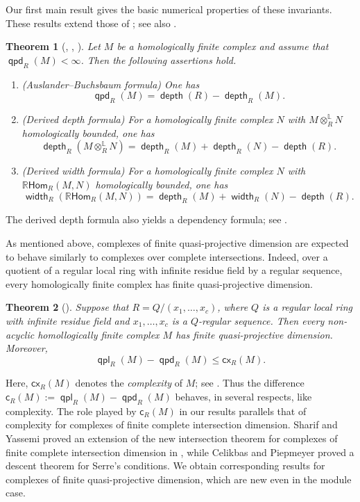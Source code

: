 \documentclass[10pt, a4paper,reqno]{amsart}
\newtheorem{thm}{Theorem}[section]
\theoremstyle{definition}
\theoremstyle{remark}
\numberwithin{equation}{thm}
\def\c{\mathsf{c}}
\def\depth{\operatorname{\mathsf{depth}}}
\def\width{\operatorname{\mathsf{width}}}
\def\ltensor{\otimes^{\mathbb{L}}}
\def\rHom{\mathbb{R}\mathsf{Hom}}
\def\cx{\mathsf{cx}}
\def\qpd{\operatorname{\mathsf{qpd}}}
\def\qpl{\operatorname{\mathsf{qpl}}}
\begin{document}
Our first main result gives the basic numerical properties of these invariants.
These results extend those of \cite{FL, GJT}; see also \cite{JPMMR}.

\begin{thm}[, , ]
Let $M$ be a homologically finite complex and assume that $\qpd_R(M)<\infty$.
Then the following assertions hold.
\begin{enumerate}[\rm(1)]
\item
{\rm(Auslander--Buchsbaum formula)}
One has
\[
\qpd_R(M)=\depth(R)-\depth_R(M).
\]

\item
{\rm(Derived depth formula)}
For a homologically finite complex $N$ with $M\ltensor_RN$ homologically bounded, one has
\[
\depth_R(M\ltensor_RN)
=
\depth_R(M)+\depth_R(N)-\depth(R).
\]

\item
{\rm(Derived width formula)}
For a homologically finite complex $N$ with $\rHom_R(M,N)$ homologically bounded, one has
\[
\width_R(\rHom_R(M,N))
=
\depth_R(M)+\width_R(N)-\depth(R).
\]
\end{enumerate}
\end{thm}
\noindent
The derived depth formula also yields a dependency formula; see .

As mentioned above, complexes of finite quasi-projective dimension are expected to behave similarly to complexes over complete intersections.
Indeed, over a quotient of a regular local ring with infinite residue field by a regular sequence, every homologically finite complex has finite quasi-projective dimension.

\begin{thm}[]
Suppose that $R=Q/(x_1,\ldots,x_c)$, where $Q$ is a regular local ring with infinite residue field and $x_1,\ldots,x_c$ is a $Q$-regular sequence.
Then every non-acyclic homollogically finite complex $M$ has finite quasi-projective dimension.
Moreover,
\[
\qpl_R(M)-\qpd_R(M)\leq\cx_R(M).
\]
\end{thm}
\noindent
Here, $\cx_R(M)$ denotes the {\em complexity} of $M$; see \cite{IFR,AGP}.
Thus the difference $\c_R(M) := \qpl_R(M)-\qpd_R(M)$ behaves, in several respects, like complexity.
The role played by $\c_R(M)$ in our results parallels that of complexity for complexes of finite complete intersection dimension.
Sharif and Yassemi proved an extension of the new intersection theorem for complexes of finite complete intersection dimension in \cite{SY}, while Celikbas and Piepmeyer \cite{CP} proved a descent theorem for Serre's conditions.
We obtain corresponding results for complexes of finite quasi-projective dimension, which are new even in the module case.
\end{document}
